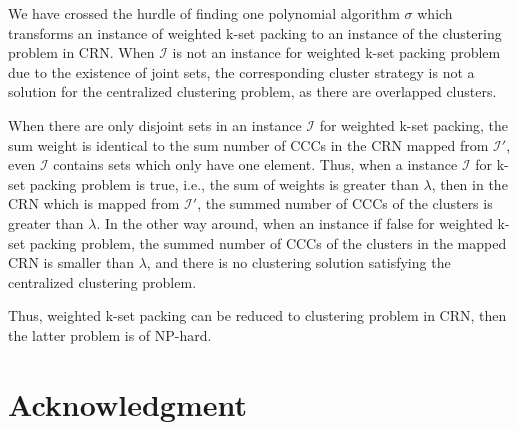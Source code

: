 \documentclass[10pt,journal,compsoc]{IEEEtran}
\makeatletter
\theoremstyle{mytheoremstyle}
\theoremstyle{mytheoremstyle}
\theoremstyle{mytheoremstyle}
\renewenvironment{proof}[1][\proofname]{%
      \par\pushQED{\qed}\fontfamily{ptm}\selectfont%
      \topsep6\p@\@plus6\p@\relax
      \trivlist\item[\hskip\labelsep\bfseries#1\@addpunct{.}]%
      \ignorespaces
    }{%
      \popQED\endtrivlist\@endpefalse
    }
\newcommand{\ie}{i.e., }
\makeatother
\begin{document}
\begin{proof}
\begin{itemize}
\end{itemize}

We have crossed the hurdle of finding one polynomial algorithm $\sigma$ which transforms an instance of weighted k-set packing to an instance of the clustering problem in CRN.
When $\mathcal{I}$ is not an instance for weighted k-set packing problem due to the existence of joint sets, the corresponding cluster strategy is not a solution for the centralized clustering problem, as there are overlapped clusters.

When there are only disjoint sets in an instance $\mathcal{I}$ for weighted k-set packing, the sum weight is identical to the sum number of CCCs in the CRN mapped from $\mathcal{I'}$, even $\mathcal{I}$ contains sets which only have one element.
Thus, when a instance $\mathcal{I}$ for k-set packing problem is true, \ie the sum of weights is greater than $\lambda$, then in the CRN which is mapped from $\mathcal{I'}$, the summed number of CCCs of the clusters is greater than $\lambda$.
In the other way around, when an instance if false for weighted k-set packing problem,
the summed number of CCCs of the clusters in the mapped CRN is smaller than $\lambda$, and there is no clustering solution satisfying the centralized clustering problem.


Thus, weighted k-set packing can be reduced to clustering problem in CRN, then the latter problem is of NP-hard.
\end{proof}


\section*{Acknowledgment}
\end{document}
